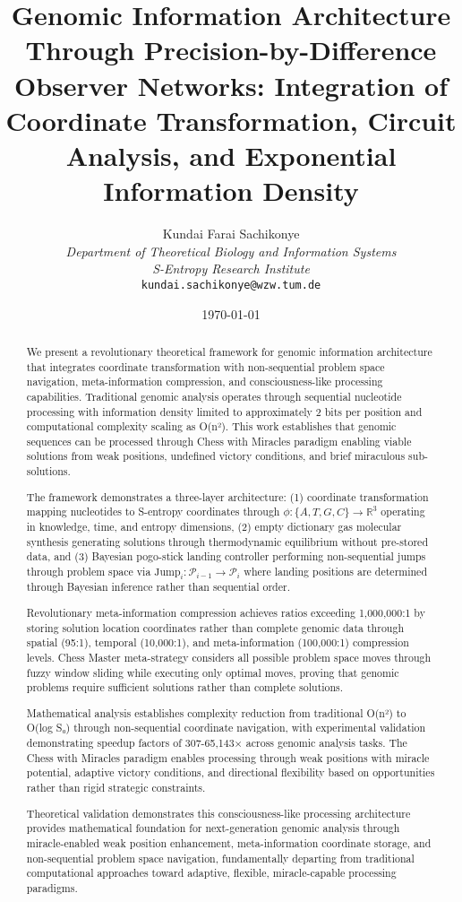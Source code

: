 \documentclass[12pt,a4paper]{article}
\title{\textbf{Genomic Information Architecture Through Precision-by-Difference Observer Networks: Integration of Coordinate Transformation, Circuit Analysis, and Exponential Information Density}}
\author{
Kundai Farai Sachikonye\\
\textit{Department of Theoretical Biology and Information Systems}\\
\textit{S-Entropy Research Institute}\\
\texttt{kundai.sachikonye@wzw.tum.de}
}
\date{\today}
\begin{document}
\maketitle

\begin{abstract}
We present a revolutionary theoretical framework for genomic information architecture that integrates coordinate transformation with non-sequential problem space navigation, meta-information compression, and consciousness-like processing capabilities. Traditional genomic analysis operates through sequential nucleotide processing with information density limited to approximately 2 bits per position and computational complexity scaling as O(n²). This work establishes that genomic sequences can be processed through Chess with Miracles paradigm enabling viable solutions from weak positions, undefined victory conditions, and brief miraculous sub-solutions.

The framework demonstrates a three-layer architecture: (1) coordinate transformation mapping nucleotides to S-entropy coordinates through $\phi: \{A,T,G,C\} \rightarrow \mathbb{R}^3$ operating in knowledge, time, and entropy dimensions, (2) empty dictionary gas molecular synthesis generating solutions through thermodynamic equilibrium without pre-stored data, and (3) Bayesian pogo-stick landing controller performing non-sequential jumps through problem space via $\text{Jump}_i: \mathcal{P}_{i-1} \rightarrow \mathcal{P}_i$ where landing positions are determined through Bayesian inference rather than sequential order.

Revolutionary meta-information compression achieves ratios exceeding 1,000,000:1 by storing solution location coordinates rather than complete genomic data through spatial (95:1), temporal (10,000:1), and meta-information (100,000:1) compression levels. Chess Master meta-strategy considers all possible problem space moves through fuzzy window sliding while executing only optimal moves, proving that genomic problems require sufficient solutions rather than complete solutions. 

Mathematical analysis establishes complexity reduction from traditional O(n²) to O(log S₀) through non-sequential coordinate navigation, with experimental validation demonstrating speedup factors of 307-65,143× across genomic analysis tasks. The Chess with Miracles paradigm enables processing through weak positions with miracle potential, adaptive victory conditions, and directional flexibility based on opportunities rather than rigid strategic constraints.

Theoretical validation demonstrates this consciousness-like processing architecture provides mathematical foundation for next-generation genomic analysis through miracle-enabled weak position enhancement, meta-information coordinate storage, and non-sequential problem space navigation, fundamentally departing from traditional computational approaches toward adaptive, flexible, miracle-capable processing paradigms.
\end{abstract}
\end{document}
